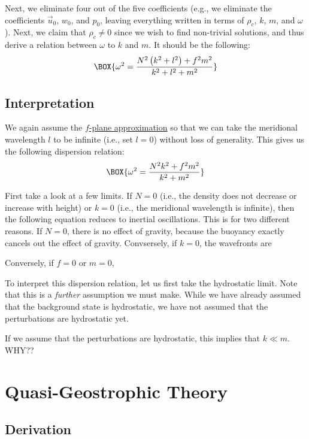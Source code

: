 \vspace{2mm} Next, we eliminate four out of the five coefficients (e.g., we eliminate the coefficients $\vec{u}_0$, $w_0$, and $p_0$, leaving everything written in terms of $\rho_c$, $k$, $m$, and $\omega$). Next, we claim that $\rho_c\neq 0$ since we wish to find non-trivial solutions, and thus derive a relation between $\omega$ to $k$ and $m$. It should be the following:
\begin{gather}
    \BOX{\omega^2 = \frac{N^2 \left( k^2 + l^2 \right) + f^2 m^2}{k^2 + l^2 + m^2}}
\end{gather}

\subsection{Interpretation}

We again assume the \hyperref[f plane box]{$f$-plane approximation} so that we can take the meridional wavelength $l$ to be infinite (i.e., set $l=0$) without loss of generality. This gives us the following dispersion relation:
\begin{align}
    \BOX{\omega^2 = \frac{N^2  k^2   + f^2 m^2}{k^2 + m^2}}
\end{align}

First take a look at a few limits. If $N=0$ (i.e., the density does not decrease or increase with height) or $k=0$ (i.e., the meridional wavelength is infinite), then the following equation reduces to inertial oscillations. This is for two different reasons. If $N=0$, there is no effect of gravity, because the buoyancy exactly cancels out the effect of gravity. Convsersely, if $k=0$, the wavefronts are 

Conversely, if $f=0$ or $m=0$, 

To interpret this dispersion relation, let us first take the hydrostatic limit. Note that this is a \textit{further} assumption we must make. While we have already assumed that the background state is hydrostatic, we have not assumed that the perturbations are hydrostatic yet. 

If we assume that the perturbations are hydrostatic, this implies that $k\ll m$. WHY??

\section{Quasi-Geostrophic Theory}\label{QG}

\subsection{Derivation}

